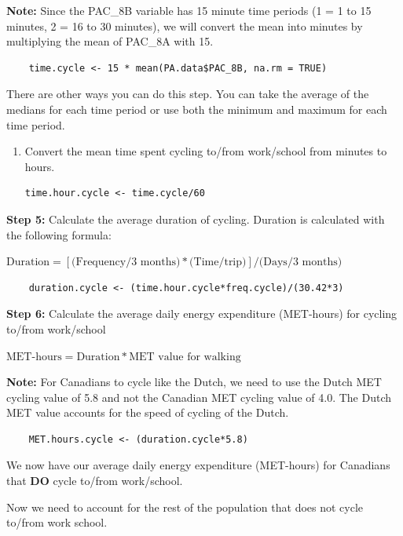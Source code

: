 \documentclass[]{book}
\begin{document}
\textbf{Note:} Since the PAC\_8B variable has 15 minute time periods (1
= 1 to 15 minutes, 2 = 16 to 30 minutes), we will convert the mean into
minutes by multiplying the mean of PAC\_8A with 15.

\begin{verbatim}
    time.cycle <- 15 * mean(PA.data$PAC_8B, na.rm = TRUE)
\end{verbatim}

There are other ways you can do this step. You can take the average of
the medians for each time period or use both the minimum and maximum for
each time period.

\begin{enumerate}
\def\labelenumi{\alph{enumi}.}
\setcounter{enumi}{2}
\item
  Convert the mean time spent cycling to/from work/school from minutes
  to hours.

\begin{verbatim}
time.hour.cycle <- time.cycle/60
\end{verbatim}
\end{enumerate}

\textbf{Step 5:} Calculate the average duration of cycling. Duration is
calculated with the following formula:

\(\text{Duration} = [\text{(Frequency/3 months)}*\text{(Time/trip)}] / \text{(Days/3 months)}\)

\begin{verbatim}
    duration.cycle <- (time.hour.cycle*freq.cycle)/(30.42*3)
\end{verbatim}

\textbf{Step 6:} Calculate the average daily energy expenditure
(MET-hours) for cycling to/from work/school

\(\text{MET-hours} = \text{Duration}*\text{MET value for walking}\)

\textbf{Note:} For Canadians to cycle like the Dutch, we need to use the
Dutch MET cycling value of 5.8 and not the Canadian MET cycling value of
4.0. The Dutch MET value accounts for the speed of cycling of the Dutch.

\begin{verbatim}
    MET.hours.cycle <- (duration.cycle*5.8)
\end{verbatim}

We now have our average daily energy expenditure (MET-hours) for
Canadians that \textbf{DO} cycle to/from work/school.

Now we need to account for the rest of the population that does not
cycle to/from work school.
\end{document}
